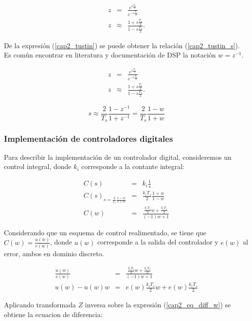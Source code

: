 \begin{eqnarray}
z &=& \frac{e^{s \frac{T_s}{2}}}{e^{-s \frac{T_s}{2}}}\\
z &\approx& \frac{1+s \frac{T_s}{2}}{1-s \frac{T_s}{2}} \label{cap2_tustin}.
\end{eqnarray}

De la expresión (\ref{cap2_tustin}) se puede obtener la relación (\ref{cap2_tustin_s}). Es común encontrar en literatura y documentación de DSP la notación $w=z^{-1}$.

\begin{eqnarray}
z &=& \frac{e^{s \frac{T_s}{2}}}{e^{-s \frac{T_s}{2}}}\\
z &\approx& \frac{1+s \frac{T_s}{2}}{1-s \frac{T_s}{2}} \label{cap2_tustin}.
\end{eqnarray}

\begin{equation}\label{cap2_tustin_s}
s \approx \frac{2}{T_s} \frac{1-z^{-1}}{1+z^{-1}} = \frac{2}{T_s} \frac{1-w}{1+w}
\end{equation}

\subsubsection{Implementación de controladores digitales}

Para describir la implementación de un controlador digital, consideremos un control integral, donde $k_i$ corresponde a la contante integral:

\begin{eqnarray}
C(s) &=& k_i \frac{1}{s}\\
C(s)_{s=\frac{2}{T_s} \frac{1-w}{1+w}} &=& \frac{k_i T_s}{2} \frac{1+w}{1-w} \\
C(w) &=& \frac{  \frac{k_i T_s}{2} w +  \frac{k_i T_s}{2} }{(-1)w+1} 
\end{eqnarray}

Considerando que un esquema de control realimentado, se tiene que $C(w) = \frac{u(w)}{e(w)}$, donde $u(w)$ corresponde a la salida del controlador y $e(w)$ al error, ambos en dominio discreto.

\begin{eqnarray}
\frac{u(w)}{e(w)} &=& \frac{  \frac{k_i T_s}{2} w +  \frac{k_i T_s}{2} }{(-1)w+1} \\
u(w)-u(w)w &=& e(w) \frac{k_i T_s}{2} w +  e(w) \frac{k_i T_s}{2} \label{cap2_eq_diff_w}
\end{eqnarray}

Aplicando transformada $Z$ inversa sobre la expresión (\ref{cap2_eq_diff_w}) se obtiene la ecuacion de diferencia:


